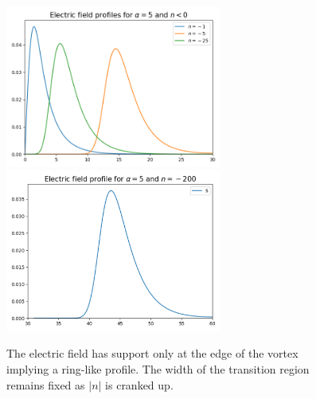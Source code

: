 \begin{figure}[H]
\begin{center}
    \includegraphics[width=2.8in]{Chapter_2_Folder_1912.11321/figures/E_alpha_5_final.png} \includegraphics[width=2.8in]{Chapter_2_Folder_1912.11321/figures/E_alpha_5_n_200.pdf} 
    \caption[This figure shows that the electric field profile for the vortex solutions (in the \textcolor{red}{a}belian Chern-Simons model at finite chemical potential and negative magnetic flux) have a ring-like profile.]{ {\small The electric field has support only at the edge of the vortex implying a ring-like profile. 
   The width of the transition region remains fixed as $|n|$ is cranked up.} }\label{fig:Eneg}
   \end{center}
\end{figure}

